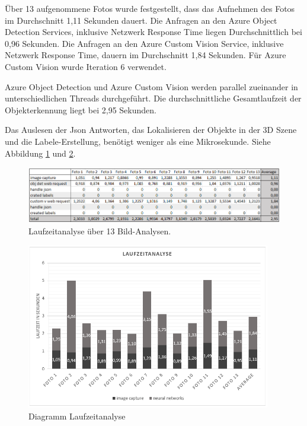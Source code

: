 Über 13 aufgenommene Fotos wurde festgestellt, dass das Aufnehmen des Fotos im Durchschnitt 1,11 Sekunden dauert. Die Anfragen an den Azure Object Detection Services, inklusive Netzwerk Response Time liegen Durchschnittlich bei 0,96 Sekunden. Die Anfragen an den Azure Custom Vision Service, inklusive Netzwerk Response Time, dauern im Durchschnitt 1,84 Sekunden. Für Azure Custom Vision wurde Iteration 6 verwendet. 

Azure Object Detection und Azure Custom Vision werden parallel zueinander in unterschiedlichen Threads durchgeführt. Die durchschnittliche Gesamtlaufzeit der Objekterkennung liegt bei 2,95 Sekunden.

Das Auslesen der Json Antworten, das Lokalisieren der Objekte in der 3D Szene und die Labele-Erstellung, benötigt weniger als eine Mikrosekunde. Siehe Abbildung \ref{table:laufzeitanalyse} und \ref{table:laufzeitanalyse2}.

\begin{figure}[H]
	\centering
	\includegraphics[width=1.1\textwidth]{images/table_Laufzeitanalyseneu.PNG}
	\caption[Laufzeitanalyse über 13 Bild-Analysen]{Laufzeitanalyse über 13 Bild-Analysen.}
	\label{table:laufzeitanalyse}
\end{figure}

\begin{figure}[H]
	\centering
	\includegraphics[width=0.95\textwidth]{images/table_Laufzeitanalyse2neu.PNG}
	\caption[Diagramm Laufzeitanalyse]{Diagramm Laufzeitanalyse}
	\label{table:laufzeitanalyse2}
\end{figure}

